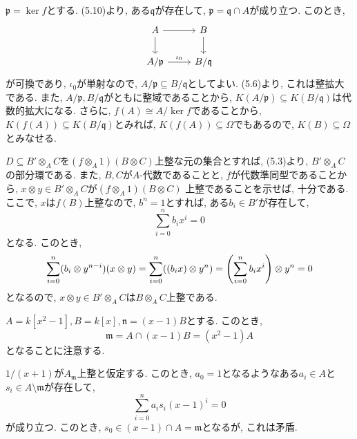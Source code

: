 \documentclass[dvipdfmx]{jsarticle}
\begin{document}
    \begin{problem}
        $\mathfrak{p} = \ker{f}$とする.
        (5.10)より, ある$\mathfrak{q}$が存在して, $\mathfrak{p} = \mathfrak{q} \cap A$が成り立つ.
        このとき,
        \[
            \begin{tikzcd}
                A \arrow[r]\arrow[d] & B  \arrow[d] \\
                A/\mathfrak{p} \arrow[r, "\iota_0"] &  B/\mathfrak{q}
            \end{tikzcd}
        \]
        が可換であり, $\iota_0$が単射なので, $A/\mathfrak{p} \subseteq B/\mathfrak{q}$としてよい.
        (5.6)より, これは整拡大である.
        また, $A/\mathfrak{p}, B/\mathfrak{q}$がともに整域であることから,
        $K(A/\mathfrak{p}) \subseteq K(B/\mathfrak{q})$は代数的拡大になる.
        さらに, $f(A) \cong A/\ker{f}$であることから, $K(f(A)) \subseteq K(B/\mathfrak{q})$とみれば,
        $K(f(A)) \subseteq \Omega$でもあるので, $K(B) \subseteq \Omega$とみなせる.
    \end{problem}

    \begin{problem}
        $D \subseteq B' \otimes_A C$を$(f\otimes_A 1)(B \otimes C)$上整な元の集合とすれば,
        (5.3)より, $B'\otimes_A C$の部分環である.
        また, $B, C$が$A$-代数であることと, $f$が代数準同型であることから,
        $x \otimes y \in B'\otimes_A C$が$(f\otimes_A 1)(B \otimes C)$
        上整であることを示せば, 十分である.
        ここで, $x$は$f(B)$上整なので, $b^n = 1$とすれば, ある$b_i \in B'$が存在して,
        \[
            \sum_{i = 0}^n b_ix^i = 0
        \]
        となる.
        このとき,
        \[
            \sum_{i = 0}^n (b_i \otimes y^{n-i})(x\otimes y) = \sum_{i=0}^n ((b_ix)\otimes y^n) = \qty(\sum_{i = 0}^n b_ix^i)\otimes y^n = 0
        \]
        となるので, $x\otimes y \in B'\otimes_A C$は$B\otimes_A C$上整である.
    \end{problem}

    \begin{problem}
        $A = k[x^2-1], B = k[x], \mathfrak{n} = (x-1)B$とする.
        このとき,
        \[
           \mathfrak{m} =  A \cap (x-1)B = (x^2-1)A
        \]
        となることに注意する.

        $1/(x+1)$が$A_{\mathfrak{m}}$上整と仮定する.
        このとき, $a_0 = 1$となるようなある$a_i \in A$と$s_i \in A \setminus \mathfrak{m}$が存在して,
        \[
            \sum_{i = 0}^n a_is_i(x-1)^i = 0
        \]
        が成り立つ.
        このとき, $s_0 \in (x-1) \cap A = \mathfrak{m}$となるが, これは矛盾.
    \end{problem}
\end{document}
